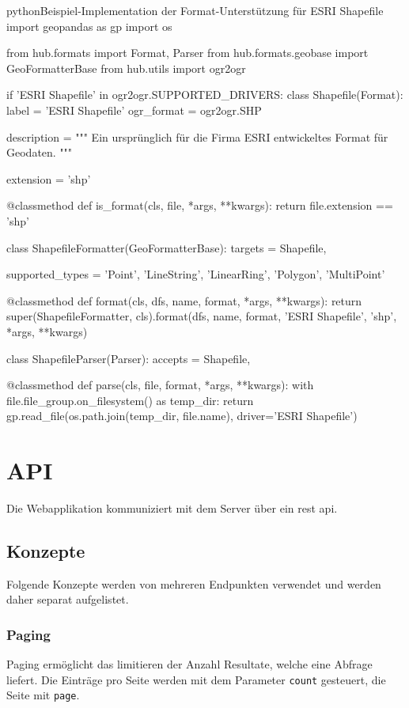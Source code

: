 \begin{srclst}[label=src:pd:format-example]{python}{Beispiel-Implementation der Format-Unterstützung für ESRI Shapefile}
import geopandas as gp
import os

from hub.formats import Format, Parser
from hub.formats.geobase import GeoFormatterBase
from hub.utils import ogr2ogr

if 'ESRI Shapefile' in ogr2ogr.SUPPORTED_DRIVERS:
    class Shapefile(Format):
        label = 'ESRI Shapefile'
        ogr_format = ogr2ogr.SHP

        description = """
        Ein ursprünglich für die Firma ESRI entwickeltes Format für Geodaten.
        """

        extension = 'shp'

        @classmethod
        def is_format(cls, file, *args, **kwargs):
            return file.extension == 'shp'

    class ShapefileFormatter(GeoFormatterBase):
        targets = Shapefile,

        supported_types = {'Point', 'LineString', 'LinearRing', 'Polygon', 'MultiPoint'}

        @classmethod
        def format(cls, dfs, name, format, *args, **kwargs):
            return super(ShapefileFormatter, cls).format(dfs, name, format, 'ESRI Shapefile', 'shp', *args, **kwargs)

    class ShapefileParser(Parser):
        accepts = Shapefile,

        @classmethod
        def parse(cls, file, format, *args, **kwargs):
            with file.file_group.on_filesystem() as temp_dir:
                return gp.read_file(os.path.join(temp_dir, file.name), driver='ESRI Shapefile')
\end{srclst}


\section{API}
Die Webapplikation kommuniziert mit dem Server über ein \gls{rest} \gls{api}.

\subsection{Konzepte}
Folgende Konzepte werden von mehreren Endpunkten verwendet und werden daher separat aufgelistet.

\subsubsection{Paging} \label{sec:pd:api-paging} 
Paging ermöglicht das limitieren der Anzahl Resultate, welche eine Abfrage liefert. Die Einträge pro Seite werden mit dem Parameter \texttt{count} gesteuert, die Seite mit \texttt{page}.

